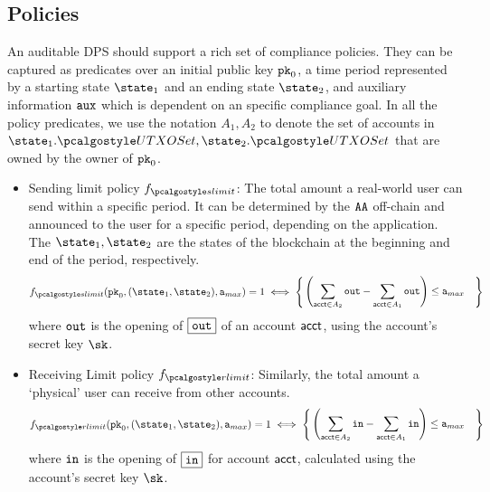 \subsection{Policies}
\label{ssec:Policies}
An auditable DPS should support a rich set of compliance policies.
They can be captured as predicates over an initial public key $\inpk$, a time period represented by a starting state $\state_1$ and an ending state $\state_2$, and auxiliary information $\aux$ which is dependent on an specific compliance goal. In all the policy predicates, we use the notation $A_1, A_2$ to denote the set of accounts in $\snap_1.\utxoset, \snap_2.\utxoset$ that are owned by the owner of $\inpk$.

\begin{itemize}
    \item Sending limit policy $f_{\sendlimit}$: The total amount a real-world user can send within a specific period. It can be determined by the $\AA$ off-chain and announced to the user for a specific period, depending on the application. The $\snap_1, \snap_2$ are the states of the blockchain at the beginning and end of the period, respectively.
    \begin{align*}
        f_{\sendlimit}(\inpk, (\snap_1, \snap_2), \srlimit) = 1 \iff 
        \left\{ \begin{aligned}
                            &  \left(\sum_{\acct\in A_2}{\varout} - \sum_{\acct \in A_1}{\varout} \right)
                            \leq \srlimit 
                 \end{aligned} \right\}
    \end{align*}
    where $\varout$ is the opening of $\comm{\varout}$ of an account $\acct$, using the account's secret key $\sk$.
    \item Receiving Limit policy $f_{\receivelimit}$: Similarly, the total amount a `physical' user can receive from other accounts.
        \begin{align*}
           f_{\receivelimit}(\inpk, (\snap_1, \snap_2), \srlimit) = 1  \iff 
           \left\{ \begin{aligned} 
                    & \left(\sum_{\acct\in A_2}{\varin} - \sum_{\acct \in A_1}{\varin}\right) \leq \srlimit
            \end{aligned} \right\}
        \end{align*}
        where $\varin$ is the opening of $\comm{\varin}$ for account $\acct$, calculated using the account's secret key $\sk$.


\end{itemize}
